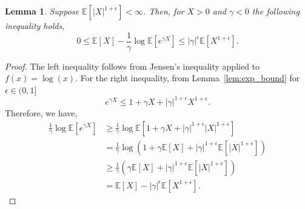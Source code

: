 \documentclass{article}
\theoremstyle{plain}
\theoremstyle{plain}
\newtheorem{lemma}[theorem]{Lemma}
\theoremstyle{definition}
\theoremstyle{remark}
\newcommand{\mbE}{\mathbb{E}}
\begin{document}
\begin{lemma}\label{lem:SE_vs_linear_epsilon}
    Suppose $\mbE[|X|^{1+\epsilon}] < \infty$. Then, for $X>0$ and $\gamma<0$ the following inequality holds,
\begin{equation*}
        0 \leq \mbE[X]- \frac{1}{\gamma} \log{\mbE[e^{\gamma X}]}  \leq  |\gamma|^{\epsilon}\mbE[X^{1+\epsilon}] .
    \end{equation*}
\end{lemma}
\begin{proof}
    The left  inequality follows from Jensen's inequality applied to $f(x) = \log{(x)}$. For the right inequality, from Lemma~\ref{lem:exp_bound} for $\epsilon\in(0,1]$
    \begin{equation}\label{eq:exp_bound_epsilon}
         e^{\gamma X} \leq 1 + \gamma X + |\gamma|^{1+\epsilon} X^{1+\epsilon}.
    \end{equation}
    Therefore, we have,
    \begin{equation*}
    \begin{split}
         \frac{1}{\gamma} \log{\mbE[e^{\gamma X}]} &\geq \frac{1}{\gamma} \log{\mbE\left[1 + \gamma X + |\gamma|^{1+\epsilon} |X|^{1+\epsilon}\right]}
         \\&= \frac{1}{\gamma} \log{ \left(1 + \gamma \mbE[X] + |\gamma|^{1+\epsilon} \mbE[|X|^{1+\epsilon}] \right)}
         \\& \geq \frac{1}{\gamma} \left( \gamma \mbE[X] + |\gamma|^{1+\epsilon} \mbE[|X|^{1+\epsilon}]\right)
         \\& = \mbE[X] - |\gamma|^{\epsilon}\mbE[X^{1+\epsilon}].
    \end{split}
    \end{equation*}
\end{proof}
\end{document}
